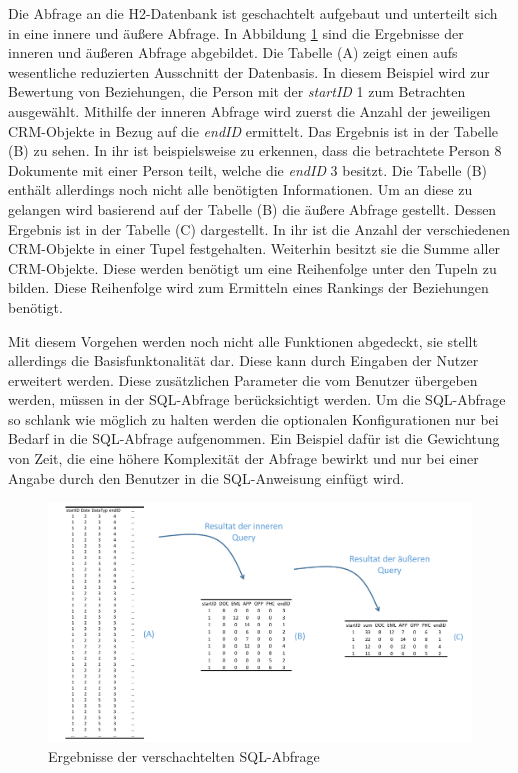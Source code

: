 Die Abfrage an die H2-Datenbank ist geschachtelt aufgebaut und unterteilt sich in eine innere und äußere Abfrage. In Abbildung \ref{umsetzung_sql} sind die Ergebnisse der inneren und äußeren Abfrage abgebildet. Die Tabelle (A) zeigt einen aufs wesentliche reduzierten Ausschnitt der Datenbasis. In diesem Beispiel wird zur Bewertung von Beziehungen, die Person mit der \textit{startID} 1 zum Betrachten ausgewählt. Mithilfe der inneren Abfrage wird zuerst die Anzahl der jeweiligen CRM-Objekte in Bezug auf die \textit{endID} ermittelt. Das Ergebnis ist in der Tabelle (B) zu sehen. In ihr ist beispielsweise zu erkennen, dass die betrachtete Person 8 Dokumente mit einer Person teilt, welche die \textit{endID} 3 besitzt. Die Tabelle (B) enthält allerdings noch nicht alle benötigten Informationen. Um an diese zu gelangen wird basierend auf der Tabelle (B)  die äußere Abfrage gestellt. Dessen Ergebnis ist in der Tabelle (C) dargestellt. In ihr ist die Anzahl der verschiedenen CRM-Objekte in einer Tupel festgehalten. Weiterhin besitzt sie die Summe aller CRM-Objekte. Diese werden benötigt um eine Reihenfolge unter den Tupeln zu bilden. Diese Reihenfolge wird zum Ermitteln eines Rankings der Beziehungen benötigt.

Mit diesem Vorgehen werden noch nicht alle Funktionen abgedeckt, sie stellt allerdings die Basisfunktonalität dar. Diese kann durch Eingaben der Nutzer erweitert werden. Diese zusätzlichen Parameter die vom Benutzer übergeben werden, müssen in der SQL-Abfrage berücksichtigt werden. Um die SQL-Abfrage so schlank wie möglich zu halten werden die optionalen Konfigurationen nur bei Bedarf in die SQL-Abfrage aufgenommen. Ein Beispiel dafür ist die Gewichtung von Zeit, die eine höhere Komplexität der Abfrage bewirkt und nur bei einer Angabe durch den Benutzer in die SQL-Anweisung einfügt wird.


\begin{figure}[htbp]
\centering
  \includegraphics[width=1.0\textwidth]{pics/sql_abfrage.pdf}
\caption{Ergebnisse der verschachtelten SQL-Abfrage}
\label{umsetzung_sql}
\end{figure}


